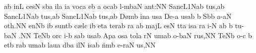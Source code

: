\punctum a\augmentum b\egn
\spatium
\divisiominor
\spatium
\sgn {}in\punctum L\egn
\sgn ces\punctum N\egn
\sgn s{\a}b\punctum a\egn
\sgn {}il\punctum a\egn
\sgn {}i{}\punctum a\egn
\spatium
\sgn voc\punctum a\egn
\sgn {}e{}\punctum b\egn
\spatium
\custos a
\lineaproxima
{}oc\pes ab\egn
\sgn l{\a}{-m}\climacus baN\egn
\sgn {}a{nt:}\punctum N\augmentum N\egn
\spatium
\divisiofinalis
\spatium
\sgn Sa{nc}\episem L1\Salicus Nab\egn
\sgn tu{s,}\punctum a\augmentum b\egn
\spatium
\divisiofinalis
\spatium
\sgn Sa{nc}\episem L1\Salicus Nab\egn
\sgn tu{s,}\punctum a\augmentum b\egn
\spatium
\divisiofinalis
\spatium
\sgn Sa{nc}\episem L1\Salicus Nab\egn
\sgn tu{s,}\punctum a\augmentum b\egn
\spatium
\divisiominor
\spatium
\sgn D{\o}m\punctum b\egn
\sgn {}in\punctum a\egn
\sgn {}us\punctum a\egn
\spatium
\sgn De-\punctum a\egn
\sgn {}us\pes ab\egn
\spatium
\custos b
\lineaproxima
\sgn S{\a}b\punctum b\egn
\sgn {}a-\clivis aN\egn
\sgn {}o{th.}\punctum N\augmentum N\egn
\spatium
\divisiofinalis
\spatium
{}en\pes Nb\egn
\sgn {}i{}\punctum b\egn
\spatium
\sgn su{nt}\punctum b\egn
\spatium
\sgn c{\ae}l\punctum c\egn
\sgn {}i{}\punctum b\egn
\spatium
\sgn {}et\punctum a\egn
\spatium
\sgn ter\pes ab\egn
\sgn ra{}%
\punctum a\augmentum b\egn
\spatium
\divisiominor
\spatium
\sgn maj\punctum L\egn
\sgn {}es\punctum N\egn
\sgn t{\a}t\punctum a\egn
\sgn {}is\punctum a\egn
\spatium
{}r\punctum a\egn
\sgn {}i-\punctum N\egn
\sgn {}{\ae}{}\pes ab\egn
\spatium
\custos b
\lineaproxima
\sgn tu-\climacus baN\egn
\sgn {}{\ae}.\punctum N\augmentum N\egn
\spatium
\divisiofinalis
\spatium
\sgn Te{}\pes Nb\egn
\spatium
{}or\punctum c\egn
\sgn {}i-\punctum b\egn
\sgn {}{\o}s\pes ab\egn
\sgn {}us\punctum a\augmentum b\egn
\spatium
\sgn {}Ap\punctum a\egn
\sgn {}os\punctum a\egn
\sgn tol\punctum a\egn
\sgn {}{\o}r\punctum N\egn
\sgn {}um\pes ab\egn
\spatium
{}o-\climacus baN\egn
\sgn ru{s,}\punctum N\augmentum N\egn
\spatium
\divisiofinalis
\spatium
\sgn Te{}\pes Nb\egn
\spatium
{}o-\engl{}\punctum c\egn
\custos b
\lineaproxima
{}et\punctum b\egn
\sgn {}{\a}r\pes ab\egn
\sgn {}um\punctum a\augmentum b\egn
\spatium
\sgn lau\punctum a\egn
\sgn d{\a}b\punctum a\egn
\sgn {}il\punctum N\egn
\sgn {}is\pes ab\egn
\spatium
\sgn n{\u}m\punctum b\egn
\sgn {}e{-r}\clivis aN\egn
\sgn {}u{s,}\punctum N\augmentum N\egn
